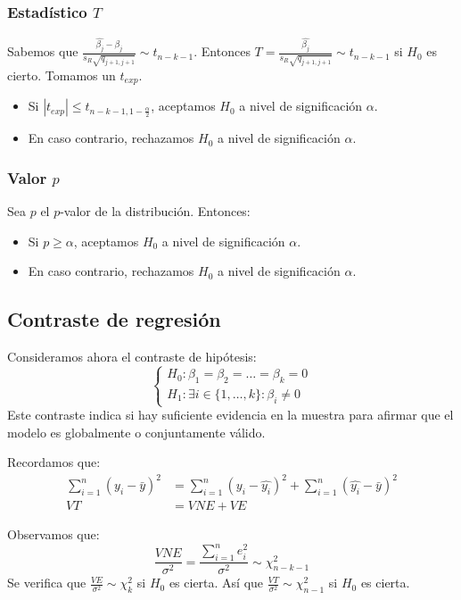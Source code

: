 \subsubsection*{Estadístico $T$}
Sabemos que $\frac{\hat{\beta_j} - \beta_j}{s_R \sqrt{q_{j+1, j+1}}} \sim t_{n-k-1}$.
Entonces $T = \frac{\hat{\beta_j}}{s_R \sqrt{q_{j+1, j+1}}} \sim t_{n-k-1}$ si $H_0$ es cierto.
Tomamos un $t_{exp}$.
\begin{itemize}
    \item Si $|t_{exp}| \leq t_{n-k-1, 1-\frac{\alpha}{2}}$, aceptamos $H_0$ a nivel de significación $\alpha$.
    \item En caso contrario, rechazamos $H_0$ a nivel de significación $\alpha$.
\end{itemize}

\subsubsection*{Valor $p$}
Sea $p$ el $p$-valor de la distribución. Entonces:
\begin{itemize}
    \item Si $p \geq \alpha$, aceptamos $H_0$ a nivel de significación $\alpha$.
    \item En caso contrario, rechazamos $H_0$ a nivel de significación $\alpha$.
\end{itemize}

\subsection*{Contraste de regresión}
Consideramos ahora el contraste de hipótesis:
$$\begin{cases}
        H_0: \beta_1 = \beta_2 = \dots = \beta_k = 0 \\
        H_1: \exists i \in \{1, \dots, k\} : \beta_i \neq 0
    \end{cases}$$
Este contraste indica si hay suficiente evidencia en la muestra para afirmar que el modelo es globalmente o conjuntamente válido.

Recordamos que:
\begin{align*}
    \sum_{i=1}^n (y_i - \bar{y})^2 & = \sum_{i=1}^n (y_i - \hat{y_i})^2 + \sum_{i=1}^n (\hat{y_i} - \bar{y})^2 \\
    VT                             & = VNE + VE
\end{align*}

Observamos que:
$$\frac{VNE}{\sigma^2} = \frac{\sum_{i=1}^n e_i^2}{\sigma^2} \sim \chi^2_{n-k-1}$$
Se verifica que $\frac{VE}{\sigma^2} \sim \chi^2_k$ si $H_0$ es cierta.
Así que $\frac{VT}{\sigma^2} \sim \chi^2_{n-1}$ si $H_0$ es cierta.

